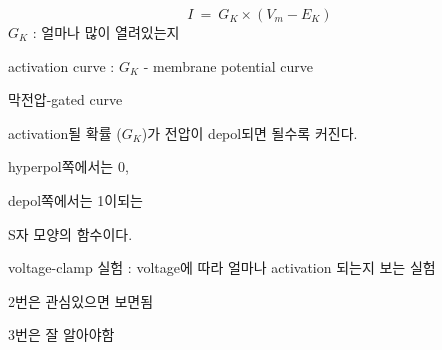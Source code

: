 \documentclass[10pt]{amsart}
\numberwithin{theorem}{section}
\numberwithin{example}{section}
\theoremstyle{definition}
\theoremstyle{remark}
\begin{document}
\begin{equation}
    I \  = \ G_K \times (V_m - E_K)
\end{equation}
$G_K$ : 얼마나 많이 열려있는지 

activation curve : $G_K$ - membrane potential curve 

막전압-gated curve

activation될 확률 ($G_K$)가 전압이 depol되면 될수록 커진다. 

hyperpol쪽에서는 0,

depol쪽에서는 1이되는 

S자 모양의 함수이다. 


voltage-clamp 실험 : voltage에 따라 얼마나 activation 되는지 보는 실험 


2번은 관심있으면 보면됨 

3번은 잘 알아야함 
\end{document}
